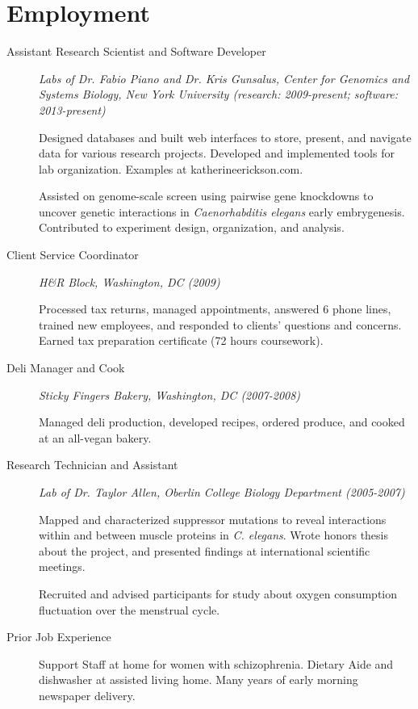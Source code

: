 \documentclass{article}
\begin{document}
	\section*{Employment}
	\begin{description}
		\item[Assistant Research Scientist and Software Developer]
		\emph{Labs of Dr. Fabio Piano and Dr. Kris Gunsalus,
			Center for Genomics and Systems Biology,
			New York University
			(research: 2009-present; software: 2013-present)
		}

		Designed databases and built web interfaces to store, present, 
		and navigate data for various research projects.
		Developed and implemented tools for lab organization.
		Examples at katherineerickson.com.
		
		Assisted on genome-scale screen using pairwise gene knockdowns to uncover
		genetic interactions in \emph{Caenorhabditis elegans} early embrygenesis. 
		Contributed to experiment design, organization, and analysis.

		\item[Client Service Coordinator]
		\emph{H\&R Block, Washington, DC (2009)}
			
		Processed tax returns, managed appointments, answered 6 phone lines, 
		trained new employees, and responded to clients' questions and concerns.
		Earned tax preparation certificate (72 hours coursework).

		\item[Deli Manager and Cook]
		\emph{Sticky Fingers Bakery, Washington, DC (2007-2008)}
		
		Managed deli production, developed recipes, ordered produce,
		and cooked at an all-vegan bakery.

		\item[Research Technician and Assistant]
		\emph{Lab of Dr. Taylor Allen,
			Oberlin College Biology Department (2005-2007)
		}
		
		Mapped and characterized suppressor mutations to reveal interactions 
		within and between muscle proteins in \emph{C. elegans}.
		Wrote honors thesis about the project, 
		and presented findings at international scientific meetings.

		Recruited and advised participants for study about oxygen
		consumption fluctuation over the menstrual cycle.

		\item[Prior Job Experience]
		Support Staff at home for women with schizophrenia.
		Dietary Aide and dishwasher at assisted living home.
		Many years of early morning newspaper delivery.
	\end{description}
\end{document}

